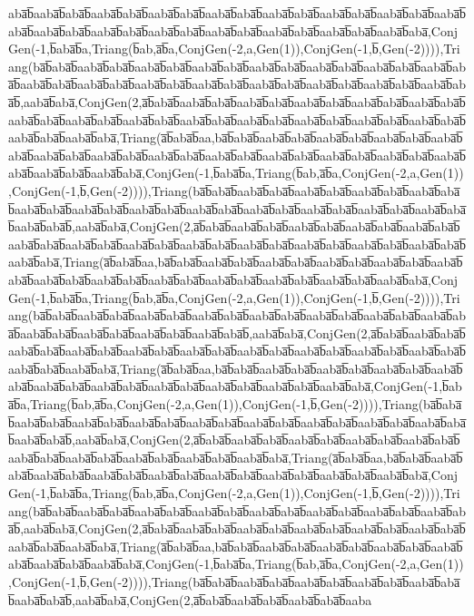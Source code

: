 aba̅b̅aaba̅b̅aba̅b̅aaba̅b̅aba̅b̅aaba̅b̅aba̅b̅aaba̅b̅aba̅b̅aaba̅b̅aba̅b̅aaba̅b̅aba̅b̅aaba̅b̅aba̅b̅aaba̅b̅aba̅b̅aaba̅b̅aba̅b̅aaba̅b̅aba̅b̅aaba̅b̅aba̅b̅aaba̅b̅aba̅b̅aaba̅b̅aba̅b̅aaba̅b̅aba̅b̅aaba̅b̅aba̅,ConjGen(-1,b̅aba̅b̅a,Triang(b̅ab,a̅b̅a,ConjGen(-2,a,Gen(1)),ConjGen(-1,b̅,Gen(-2)))),Triang(ba̅b̅aba̅b̅aaba̅b̅aba̅b̅aaba̅b̅aba̅b̅aaba̅b̅aba̅b̅aaba̅b̅aba̅b̅aaba̅b̅aba̅b̅aaba̅b̅aba̅b̅aaba̅b̅aba̅b̅aaba̅b̅aba̅b̅aaba̅b̅aba̅b̅aaba̅b̅aba̅b̅aaba̅b̅aba̅b̅aaba̅b̅aba̅b̅aaba̅b̅aba̅b̅aaba̅b̅aba̅b̅aaba̅b̅aba̅b̅,aaba̅b̅aba̅,ConjGen(2,a̅b̅aba̅b̅aaba̅b̅aba̅b̅aaba̅b̅aba̅b̅aaba̅b̅aba̅b̅aaba̅b̅aba̅b̅aaba̅b̅aba̅b̅aaba̅b̅aba̅b̅aaba̅b̅aba̅b̅aaba̅b̅aba̅b̅aaba̅b̅aba̅b̅aaba̅b̅aba̅b̅aaba̅b̅aba̅b̅aaba̅b̅aba̅b̅aaba̅b̅aba̅b̅aaba̅b̅aba̅b̅aaba̅b̅aba̅,Triang(a̅b̅aba̅b̅aa,ba̅b̅aba̅b̅aaba̅b̅aba̅b̅aaba̅b̅aba̅b̅aaba̅b̅aba̅b̅aaba̅b̅aba̅b̅aaba̅b̅aba̅b̅aaba̅b̅aba̅b̅aaba̅b̅aba̅b̅aaba̅b̅aba̅b̅aaba̅b̅aba̅b̅aaba̅b̅aba̅b̅aaba̅b̅aba̅b̅aaba̅b̅aba̅b̅aaba̅b̅aba̅b̅aaba̅b̅aba̅,ConjGen(-1,b̅aba̅b̅a,Triang(b̅ab,a̅b̅a,ConjGen(-2,a,Gen(1)),ConjGen(-1,b̅,Gen(-2)))),Triang(ba̅b̅aba̅b̅aaba̅b̅aba̅b̅aaba̅b̅aba̅b̅aaba̅b̅aba̅b̅aaba̅b̅aba̅b̅aaba̅b̅aba̅b̅aaba̅b̅aba̅b̅aaba̅b̅aba̅b̅aaba̅b̅aba̅b̅aaba̅b̅aba̅b̅aaba̅b̅aba̅b̅aaba̅b̅aba̅b̅aaba̅b̅aba̅b̅aaba̅b̅aba̅b̅,aaba̅b̅aba̅,ConjGen(2,a̅b̅aba̅b̅aaba̅b̅aba̅b̅aaba̅b̅aba̅b̅aaba̅b̅aba̅b̅aaba̅b̅aba̅b̅aaba̅b̅aba̅b̅aaba̅b̅aba̅b̅aaba̅b̅aba̅b̅aaba̅b̅aba̅b̅aaba̅b̅aba̅b̅aaba̅b̅aba̅b̅aaba̅b̅aba̅b̅aaba̅b̅aba̅b̅aaba̅b̅aba̅,Triang(a̅b̅aba̅b̅aa,ba̅b̅aba̅b̅aaba̅b̅aba̅b̅aaba̅b̅aba̅b̅aaba̅b̅aba̅b̅aaba̅b̅aba̅b̅aaba̅b̅aba̅b̅aaba̅b̅aba̅b̅aaba̅b̅aba̅b̅aaba̅b̅aba̅b̅aaba̅b̅aba̅b̅aaba̅b̅aba̅b̅aaba̅b̅aba̅b̅aaba̅b̅aba̅,ConjGen(-1,b̅aba̅b̅a,Triang(b̅ab,a̅b̅a,ConjGen(-2,a,Gen(1)),ConjGen(-1,b̅,Gen(-2)))),Triang(ba̅b̅aba̅b̅aaba̅b̅aba̅b̅aaba̅b̅aba̅b̅aaba̅b̅aba̅b̅aaba̅b̅aba̅b̅aaba̅b̅aba̅b̅aaba̅b̅aba̅b̅aaba̅b̅aba̅b̅aaba̅b̅aba̅b̅aaba̅b̅aba̅b̅aaba̅b̅aba̅b̅aaba̅b̅aba̅b̅,aaba̅b̅aba̅,ConjGen(2,a̅b̅aba̅b̅aaba̅b̅aba̅b̅aaba̅b̅aba̅b̅aaba̅b̅aba̅b̅aaba̅b̅aba̅b̅aaba̅b̅aba̅b̅aaba̅b̅aba̅b̅aaba̅b̅aba̅b̅aaba̅b̅aba̅b̅aaba̅b̅aba̅b̅aaba̅b̅aba̅b̅aaba̅b̅aba̅,Triang(a̅b̅aba̅b̅aa,ba̅b̅aba̅b̅aaba̅b̅aba̅b̅aaba̅b̅aba̅b̅aaba̅b̅aba̅b̅aaba̅b̅aba̅b̅aaba̅b̅aba̅b̅aaba̅b̅aba̅b̅aaba̅b̅aba̅b̅aaba̅b̅aba̅b̅aaba̅b̅aba̅b̅aaba̅b̅aba̅,ConjGen(-1,b̅aba̅b̅a,Triang(b̅ab,a̅b̅a,ConjGen(-2,a,Gen(1)),ConjGen(-1,b̅,Gen(-2)))),Triang(ba̅b̅aba̅b̅aaba̅b̅aba̅b̅aaba̅b̅aba̅b̅aaba̅b̅aba̅b̅aaba̅b̅aba̅b̅aaba̅b̅aba̅b̅aaba̅b̅aba̅b̅aaba̅b̅aba̅b̅aaba̅b̅aba̅b̅aaba̅b̅aba̅b̅,aaba̅b̅aba̅,ConjGen(2,a̅b̅aba̅b̅aaba̅b̅aba̅b̅aaba̅b̅aba̅b̅aaba̅b̅aba̅b̅aaba̅b̅aba̅b̅aaba̅b̅aba̅b̅aaba̅b̅aba̅b̅aaba̅b̅aba̅b̅aaba̅b̅aba̅b̅aaba̅b̅aba̅,Triang(a̅b̅aba̅b̅aa,ba̅b̅aba̅b̅aaba̅b̅aba̅b̅aaba̅b̅aba̅b̅aaba̅b̅aba̅b̅aaba̅b̅aba̅b̅aaba̅b̅aba̅b̅aaba̅b̅aba̅b̅aaba̅b̅aba̅b̅aaba̅b̅aba̅,ConjGen(-1,b̅aba̅b̅a,Triang(b̅ab,a̅b̅a,ConjGen(-2,a,Gen(1)),ConjGen(-1,b̅,Gen(-2)))),Triang(ba̅b̅aba̅b̅aaba̅b̅aba̅b̅aaba̅b̅aba̅b̅aaba̅b̅aba̅b̅aaba̅b̅aba̅b̅aaba̅b̅aba̅b̅aaba̅b̅aba̅b̅aaba̅b̅aba̅b̅,aaba̅b̅aba̅,ConjGen(2,a̅b̅aba̅b̅aaba̅b̅aba̅b̅aaba̅b̅aba̅b̅aaba̅b̅aba̅b̅aaba̅b̅aba̅b̅aaba̅b̅aba̅b̅aaba̅b̅aba̅b̅aaba̅b̅aba̅,Triang(a̅b̅aba̅b̅aa,ba̅b̅aba̅b̅aaba̅b̅aba̅b̅aaba̅b̅aba̅b̅aaba̅b̅aba̅b̅aaba̅b̅aba̅b̅aaba̅b̅aba̅b̅aaba̅b̅aba̅,ConjGen(-1,b̅aba̅b̅a,Triang(b̅ab,a̅b̅a,ConjGen(-2,a,Gen(1)),ConjGen(-1,b̅,Gen(-2)))),Triang(ba̅b̅aba̅b̅aaba̅b̅aba̅b̅aaba̅b̅aba̅b̅aaba̅b̅aba̅b̅aaba̅b̅aba̅b̅aaba̅b̅aba̅b̅,aaba̅b̅aba̅,ConjGen(2,a̅b̅aba̅b̅aaba̅b̅aba̅b̅aaba̅b̅aba̅b̅aaba